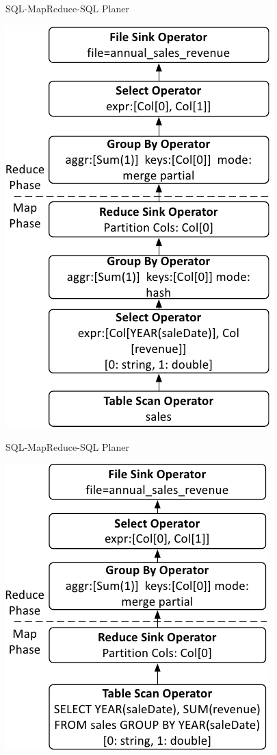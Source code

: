 \documentclass{beamer}
\begin{document}
\begin{frame}{SQL-MapReduce-SQL Planer}
  \begin{center}
    \includegraphics[height=0.8\textheight]{../ausarbeitung/images/hadoopdb-reduce-map-phase_a.png}    
  \end{center}
\end{frame}
\begin{frame}{SQL-MapReduce-SQL Planer}
  \begin{center}
    \includegraphics[height=0.8\textheight]{../ausarbeitung/images/hadoopdb-reduce-map-phase_c.png}    
  \end{center}
\end{frame}
\end{document}
